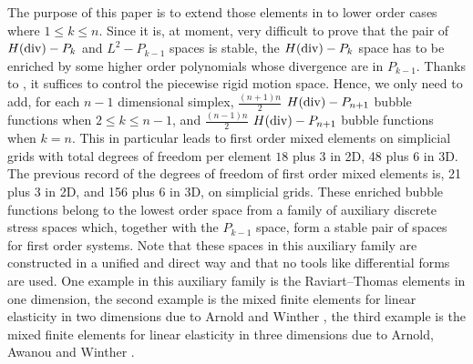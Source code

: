 \documentclass{amsart}
\numberwithin{table}{section}
\numberwithin{figure}{section}
\begin{document}
  The purpose of this paper is to extend those elements in \cite{Hu2014}
  to  lower order cases where $1\leq k\leq n$.
   Since  it is, at moment, very difficult to prove that  the pair of
    $H(\operatorname{div})-P_{k}$ and $L^2-P_{k-1}$  spaces is stable,
    the $H(\operatorname{div})-P_k$ space has  to be enriched by some higher order polynomials whose divergence
    are in $P_{k-1}$.
     Thanks to  \cite{Hu2014},   it suffices to control the  piecewise rigid motion space.  Hence,  we only need
       to add,   for each  $n-1$ dimensional simplex,
       $\frac{(n+1)n}{2}$ $H(\operatorname{div})-P_{n+1}$ bubble functions when
     $2\leq k\leq n-1$, and   $\frac{(n-1)n}{2}$ $H(\operatorname{div})-P_{n+1}$
      bubble functions when $k= n$.
      This in particular leads to first order mixed elements on  simplicial grids  with
 total degrees of freedom per element $18$ plus $3$ in 2D, 48 plus 6 in 3D.
    The previous record of  the degrees  of freedom of first order mixed elements  is,
      21 plus 3 in 2D, and   156 plus 6 in 3D, on  simplicial grids.
    These enriched bubble functions belong to the lowest order space  from a family of  auxiliary
      discrete stress spaces which, together with the  $P_{k-1}$  space, form  a stable pair of spaces for
       first order  systems. Note that these  spaces in this auxiliary family are constructed in a unified and direct way
       and that no  tools like differential forms are used. One  example in
   this auxiliary family is the Raviart--Thomas elements  in one dimension, the second
    example is   the mixed finite elements  for linear elasticity in two dimensions due to
   Arnold and  Winther \cite{Arnold-Winther-conforming},  the third   example is the mixed finite elements for linear elasticity    in three dimensions due to Arnold, Awanou and Winther \cite{Arnold-Awanou-Winther}.
\end{document}
